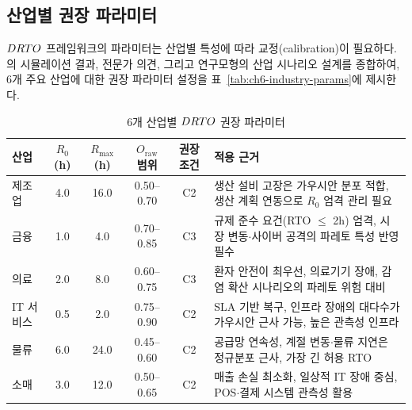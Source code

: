 
\subsection{산업별 권장 파라미터}
\label{subsec:industry-guidelines}

$DRTO$ 프레임워크의 파라미터는 산업별 특성에 따라 교정(calibration)이
필요하다. 의 시뮬레이션 결과, 전문가 의견, 그리고 연구모형의 산업
시나리오 설계를 종합하여, 6개 주요 산업에 대한 권장 파라미터 설정을
\p{[}표~\vref{tab:ch6-industry-params}\p{]}에 제시한다.

\begin{table}[htbp]
\centering
\caption{6개 산업별 $DRTO$ 권장 파라미터}
\label{tab:ch6-industry-params}
\small
\begin{tabularx}{\textwidth}{l c c c c X}
\toprule
\textbf{산업} & \textbf{$R_0$ (h)} & \textbf{$R_{\max}$ (h)} & \textbf{$O_{\text{raw}}$ 범위} & \textbf{권장 조건} & \textbf{적용 근거} \\
\midrule
제조업       & 4.0 & 16.0 & 0.50--0.70 & C2
  & 생산 설비 고장은 가우시안 분포 적합, 생산 계획 연동으로 $R_0$ 엄격 관리 필요 \\
\addlinespace
금융         & 1.0 & 4.0  & 0.70--0.85 & C3
  & 규제 준수 요건(RTO $\leq$ 2h) 엄격, 시장 변동$\cdot$사이버 공격의 파레토 특성 반영 필수 \\
\addlinespace
의료         & 2.0 & 8.0  & 0.60--0.75 & C3
  & 환자 안전이 최우선, 의료기기 장애, 감염 확산 시나리오의 파레토 위험 대비 \\
\addlinespace
IT 서비스    & 0.5 & 2.0  & 0.75--0.90 & C2
  & SLA 기반 복구, 인프라 장애의 대다수가 가우시안 근사 가능, 높은 관측성 인프라 \\
\addlinespace
물류         & 6.0 & 24.0 & 0.45--0.60 & C2
  & 공급망 연속성, 계절 변동$\cdot$물류 지연은 정규분포 근사, 가장 긴 허용 RTO \\
\addlinespace
소매         & 3.0 & 12.0 & 0.50--0.65 & C2
  & 매출 손실 최소화, 일상적 IT 장애 중심, POS$\cdot$결제 시스템 관측성 활용 \\
\bottomrule
\end{tabularx}
\end{table}


